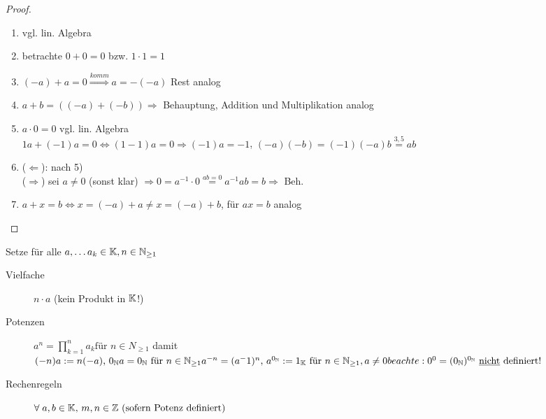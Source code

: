 \begin{proof}
	\begin{enumerate}[label=[zu 1)]
		\item vgl. lin. Algebra
		\item betrachte $0 + 0 = 0$ bzw. $1 \cdot 1 = 1$
		\item $(-a) + a = 0 \overset{komm}{\Rightarrow} a = -(-a)$ Rest analog
		\item $a+b = ((-a) + (-b)) \Rightarrow$ Behauptung, Addition und Multiplikation analog
		\item $a\cdot 0 = 0$ vgl. lin. Algebra\\
		$1a + (-1)a = 0 \Leftrightarrow (1-1)a=0 \Rightarrow (-1)a=-1$, $(-a)(-b)=(-1)(-a)b\overset{3,5}{=}ab$
		\item ($\Leftarrow$): nach 5)\\
		($\Rightarrow$) sei $a\neq0$ (sonst klar) $\Rightarrow 0 = a^{-1}\cdot 0 \overset{ab=0}{=} a^{-1}ab = b \Rightarrow$ Beh.
		\item $a+x=b \Leftrightarrow x = (-a) + a \neq x = (-a) + b$, für $ax=b$ analog \QEDA
	\end{enumerate}
\end{proof}

\noindent Setze für alle $a, \dots a_k \in \mathbb{K},n\in \mathbb{N}_{\geq 1}$
\begin{description}
	\item[Vielfache] $n\cdot a$ (kein Produkt in $\mathbb{K}$!)
	\item[Potenzen] $a^n=\prod_{k=1}^{n} a_k \text{für } n \in N_{\geq 1}$ damit $(-n)a:=n(-a) \text{, } 0_{\mathbb{N}}a=0_{\mathbb{N}} \text{ für } n\in\mathbb{N}_{\geq1}\\
	a^{-n}=(a^-1)^n \text{, }a^{0_{\mathbb{N}}}:=1_{\mathbb{K}} \text{ für } n \in \mathbb{N}_{\geq 1}, a \neq 0\\
	beachte: 0^0 = (0_{\mathbb{N}})^{0_{\mathbb{N}}} \text{ \underline{nicht} definiert!}$
	\item[Rechenregeln] $\forall\;a,b\in \mathbb{K}\text{, } m,n\in \mathbb{Z} \text{ (sofern Potenz definiert) } $
\end{description}

